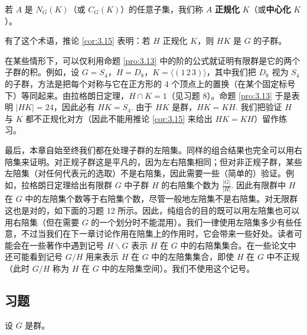 \begin{definition}
若 \(A\) 是 \(N_G(K)\)（或 \(C_G(K)\)）的任意子集，我们称 \(A\) \textbf{正规化} \(K\)（或\textbf{中心化} \(K\)）。
\end{definition}

有了这个术语，推论 \ref{cor:3.15} 表明：若 \(H\) 正规化 \(K\)，则 \(HK\) 是 \(G\) 的子群。

在某些情形下，可以仅利用命题 \ref{pro:3.13} 中的阶的公式就证明有限群是它的两个子群的积。例如，设 \(G = S_4\)，\(H = D_8\)，\(K = \langle (1\,2\,3) \rangle\)，其中我们把 \(D_8\) 视为 \(S_4\) 的子群，方法是把每个对称与它在正方形的 4 个顶点上的置换（在某个固定标号下）等同起来。由拉格朗日定理，\(H \cap K = 1\)（见习题 8）。命题 \ref{pro:3.13} 于是表明 \(|HK| = 24\)，因此必有 \(HK = S_4\). 由于 \(HK\) 是群，\(HK = KH\). 我们把验证 \(H\) 与 \(K\) 都不正规化对方（因此不能用推论 \ref{cor:3.15} 来给出 \(HK = KH\)）留作练习。

最后，本章自始至终我们都在处理子群的左陪集。同样的组合结果也完全可以用右陪集来证明。对正规子群这是平凡的，因为左右陪集相同；但对非正规子群，某些左陪集（对任何代表元的选取）不是右陪集，因此需要一些（简单的）验证。例如，拉格朗日定理给出有限群 \(G\) 中子群 \(H\) 的右陪集个数为 \(\frac{|G|}{|H|}\). 因此有限群中 \(H\) 在 \(G\) 中的左陪集个数等于右陪集个数，尽管一般地左陪集不是右陪集。对无限群这也是对的，如下面的习题 12 所示。因此，纯组合的目的既可以用左陪集也可以用右陪集（但在需要 \(G\) 的一个划分时不能混用）。我们一律使用左陪集多少有些任意，不过当我们在下一章讨论作用在陪集上的作用时，它会带来一些好处。读者可能会在一些著作中遇到记号 \(H \backslash G\) 表示 \(H\) 在 \(G\) 中的右陪集集合。在一些论文中还可能看到记号 \(G/H\) 用来表示 \(H\) 在 \(G\) 中的左陪集集合，即使 \(H\) 在 \(G\) 中不正规（此时 \(G/H\) 称为 \(H\) 在 \(G\) 中的左陪集空间）。我们不使用这个记号。

\subsection*{习题}
设 \(G\) 是群。

